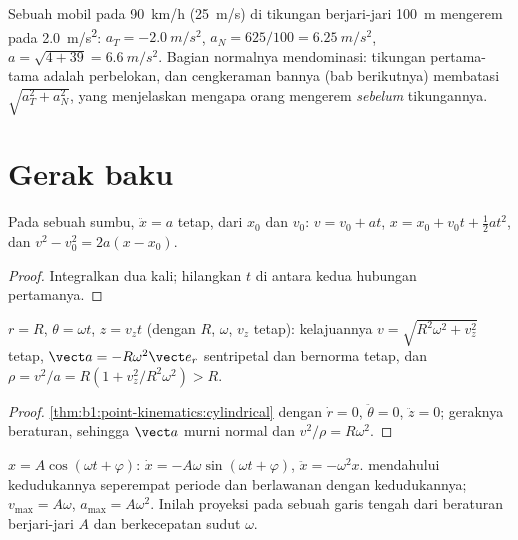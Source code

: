 \begin{example}\label{ex:b1:point-kinematics:bend}
Sebuah mobil pada \qty{90}{km/h} (\qty{25}{m/s}) di tikungan
berjari-jari \qty{100}{m} mengerem pada \qty{2.0}{m/s^2}:
$a_T = \qty{-2.0}{m/s^2}$, $a_N = 625/100 =
\qty{6.25}{m/s^2}$, $a = \sqrt{4 + 39} = \qty{6.6}{m/s^2}$. Bagian
normalnya mendominasi: tikungan pertama-tama adalah perbelokan, dan
cengkeraman bannya (bab berikutnya) membatasi $\sqrt{a_T^2 + a_N^2}$,
yang menjelaskan mengapa orang mengerem \emph{sebelum} tikungannya.
\end{example}

\section{Gerak baku}

\begin{proposition}\label{prop:b1:point-kinematics:uarm}
Pada sebuah sumbu, $\ddot x = a$ tetap, dari $x_0$ dan $v_0$:
$v = v_0 + at$, $x = x_0 + v_0t + \tfrac12 at^2$, dan
$v^2 - v_0^2 = 2a(x - x_0)$.
\end{proposition}

\begin{proof}
Integralkan dua kali; hilangkan $t$ di antara kedua hubungan pertamanya.
\end{proof}

\begin{proposition}\label{prop:b1:point-kinematics:helix}
$r = R$, $\theta = \omega t$, $z = v_zt$ (dengan $R$, $\omega$, $v_z$
tetap): kelajuannya $v = \sqrt{R^2\omega^2 + v_z^2}$ tetap, 
$\vect a = -R\omega^2\vect e_r$ sentripetal dan bernorma tetap, dan
 $\rho = v^2/a = R(1 + v_z^2/R^2\omega^2) > R$.
\end{proposition}

\begin{proof}
\cref{thm:b1:point-kinematics:cylindrical} dengan $\dot r = 0$,
$\ddot\theta = 0$, $\ddot z = 0$; geraknya beraturan, sehingga $\vect a$
murni normal dan $v^2/\rho = R\omega^2$.
\end{proof}

\begin{proposition}\label{prop:b1:point-kinematics:harmonic}
$x = A\cos(\omega t + \varphi)$: $\dot x = -A\omega\sin(\omega t + \varphi)$,
$\ddot x = -\omega^2 x$.  mendahului kedudukannya seperempat
periode dan  berlawanan dengan kedudukannya; $v_{\max} =
A\omega$, $a_{\max} = A\omega^2$. Inilah proyeksi pada sebuah garis
tengah dari  beraturan berjari-jari $A$ dan berkecepatan
sudut $\omega$.
\end{proposition}

